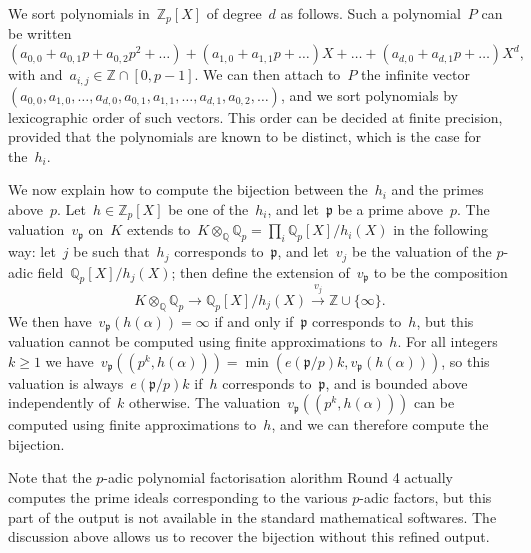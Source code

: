 \documentclass{article}
\def\Z{{\mathbb Z}}
\def\Q{{\mathbb Q}}
\def\p{{\mathfrak p}}
\DeclareMathOperator{\disc}{disc}
\begin{document}
We sort polynomials in~$\Z_p[X]$ of degree~$d$ as follows. Such a polynomial~$P$
can be written
\[
  (a_{0,0}+a_{0,1}p+a_{0,2}p^2+\dots) + (a_{1,0}+a_{1,1}p+\dots)X
  + \dots + (a_{d,0}+a_{d,1}p+\dots)X^d,
\]
with and~$a_{i,j}\in\Z\cap[0,p-1]$. We can then attach to~$P$ the infinite
vector~$(a_{0,0},a_{1,0},\dots,a_{d,0},a_{0,1},a_{1,1},\dots,a_{d,1},a_{0,2},\dots)$,
and we sort polynomials by lexicographic order of such vectors. This order can
be decided at finite precision, provided that the polynomials are known to be
distinct, which is the case for the~$h_i$.


We now explain how to compute the bijection between the~$h_i$ and the primes
above~$p$. Let~$h\in\Z_p[X]$ be one of the~$h_i$, and let~$\p$ be a prime
above~$p$. The valuation~$v_{\p}$ on~$K$ extends to~$K\otimes_{\Q}\Q_p = \prod_i
\Q_p[X]/h_i(X)$ in the following way: let~$j$ be such that~$h_{j}$ corresponds
to~$\p$, and let~$v_j$ be the valuation of the $p$-adic field~$\Q_p[X]/h_j(X)$;
then define the extension of~$v_\p$ to be the composition
\[
  K\otimes_{\Q}\Q_p \longrightarrow \Q_p[X]/h_j(X) \stackrel{v_j}{\longrightarrow} \Z\cup\{\infty\}.
\]
We then have~$v_{\p}(h(\alpha)) = \infty$ if and only
if~$\p$ corresponds to~$h$, but this valuation cannot be computed using finite
approximations to~$h$. For all integers~$k\ge 1$ we have~$v_\p((p^k,h(\alpha)))
= \min(e(\p/p)k, v_\p(h(\alpha)))$, so this valuation is always~$e(\p/p)k$
if~$h$ corresponds to~$\p$, and is bounded above independently of~$k$ otherwise. The
valuation~$v_\p((p^k,h(\alpha)))$ can be computed using finite approximations
to~$h$, and we can therefore compute the bijection.

Note that the $p$-adic polynomial factorisation alorithm Round 4 actually
computes the prime ideals corresponding to the various $p$-adic factors, but
this part of the output is not available in the standard mathematical softwares.
The discussion above allows us to recover the bijection without this refined
output.
\end{document}
